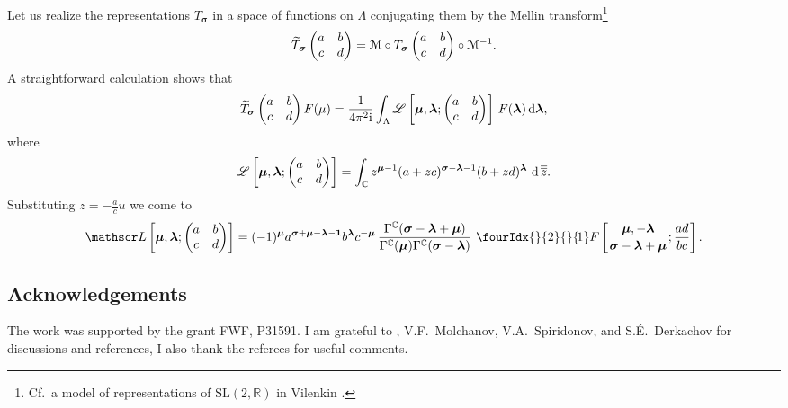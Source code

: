 \documentclass[pdftex]{sigma}
\numberwithin{equation}{section}
\newcommand{\hyp}[2]{\fourIdx{}{#1}{}{\!#2}F}
\def\wt{\widetilde}
\def\R {{\mathbb R }}
\def\C {{\mathbb C }}
\def\cL{\mathscr L}
\def\cM{\EuScript M}
\newcommand{\dd}[1]{\,{\rm d}\,{\overline{\overline{#1}}} }
\def\lambdA{{\boldsymbol{\lambda}}}
\def\mU{{\boldsymbol{\mu}}}
\def\sigmA{{\boldsymbol{\sigma}}}
\def\1{\boldsymbol{1}}
\def\SL{\mathrm{SL}}
\begin{document}
Let us realize the representations $T_\sigmA$ in a space of functions
on $\Lambda$ conjugating them by the Mellin transform\footnote{Cf.\
a model of representations of $\SL(2,\R)$ in Vilenkin
\cite[Section~VII.3]{Vil}.}
\[
\wt T_\sigmA\begin{pmatrix} a&b\\c&d \end{pmatrix} =
\cM \circ T_\sigmA\begin{pmatrix} a&b\\c&d \end{pmatrix}
\circ \cM^{-1}.
\]
A straightforward calculation shows that
\[
\wt T_\sigmA\begin{pmatrix} a&b\\c&d \end{pmatrix} F(\mu)
=\frac{1}{4\pi^2 {\rm i}} \int_\Lambda \cL\left[\mU,\lambdA;\begin{pmatrix}
 a&b\\c&d \end{pmatrix} \right] \,F(\lambdA)\,{\rm d}\lambdA,
\]
where
\[
\cL\left[\mU,\lambdA;\begin{pmatrix} a&b\\c&d \end{pmatrix} \right]=
\int_\C z^{\mU-1} (a+zc)^{\sigmA-\lambdA-1} (b+zd)^{\lambdA}\,\dd z.
\]
Substituting $z=-\frac ac u$ we come to
\[
 \cL\left[\mU,\lambdA;\begin{pmatrix} a&b\\c&d \end{pmatrix} \right]=
(-1)^\mU a^{\sigmA+\mU-\lambdA-\1} b^\lambdA c^{-\mU}\,
\frac{\Gamma^\C(\sigmA-\lambdA+\mU)}{\Gamma^\C(\mU)
\Gamma^\C(\sigmA-\lambdA)}\,\,
\hyp{2}{1}\left[\genfrac{}{}{0pt}{}{\mU,-\lambdA}{\sigmA-\lambdA+\mU};
\frac{ad}{bc}\right].
\]

\subsection*{Acknowledgements}
The work was supported by the grant FWF, P31591. I am grateful to , V.F.~Mol\-cha\-nov, V.A.~Spiridonov, and S.\'E.~Derkachov for discussions and references, I also thank the referees for useful comments.
\end{document}
